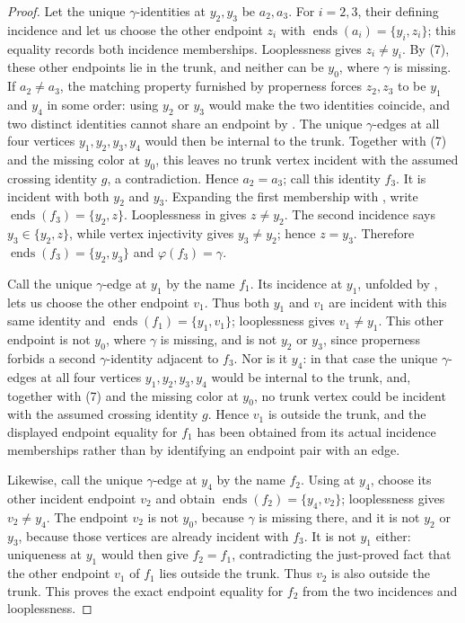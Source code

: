 \begin{proof}
Let the unique $\gamma$-identities at $y_2,y_3$ be $a_2,a_3$.  For
$i=2,3$, their defining incidence and  let us choose
the other endpoint $z_i$ with
$\operatorname{ends}(a_i)=\{y_i,z_i\}$; this equality records both
incidence memberships.  Looplessness gives $z_i\ne y_i$.  By (7), these
other endpoints lie in the trunk, and neither can be $y_0$, where
$\gamma$ is missing.  If $a_2\ne a_3$, the matching property furnished by
properness forces $z_2,z_3$ to be $y_1$ and $y_4$ in
some order: using $y_2$ or $y_3$ would make the two identities coincide,
and two distinct identities cannot share an endpoint by
.  The unique $\gamma$-edges at all four vertices
$y_1,y_2,y_3,y_4$ would then be internal to the trunk.  Together with (7)
and the missing color at $y_0$, this leaves no trunk vertex incident with
the assumed crossing identity $g$, a contradiction.  Hence
$a_2=a_3$; call this identity $f_3$.  It is incident with both $y_2$ and
$y_3$.  Expanding the first membership with , write
$\operatorname{ends}(f_3)=\{y_2,z\}$.  Looplessness in
 gives $z\ne y_2$.  The second incidence says
$y_3\in\{y_2,z\}$, while vertex injectivity gives $y_3\ne y_2$; hence
$z=y_3$.  Therefore
$\operatorname{ends}(f_3)=\{y_2,y_3\}$ and
$\varphi(f_3)=\gamma$.

Call the unique $\gamma$-edge at $y_1$ by the name $f_1$.  Its incidence
at $y_1$, unfolded by , lets us choose the other
endpoint $v_1$.  Thus both $y_1$ and $v_1$ are incident with this same
identity and
$\operatorname{ends}(f_1)=\{y_1,v_1\}$; looplessness gives
$v_1\ne y_1$.  This other endpoint is not $y_0$, where
$\gamma$ is missing, and is not $y_2$ or $y_3$, since properness forbids a
second $\gamma$-identity adjacent to $f_3$.  Nor is it $y_4$: in that case
the unique $\gamma$-edges at all four vertices $y_1,y_2,y_3,y_4$ would be
internal to the trunk, and, together with (7) and the missing color at
$y_0$, no trunk vertex could be incident with the assumed crossing
identity $g$.  Hence $v_1$ is outside the trunk, and the displayed
endpoint equality for $f_1$ has been obtained from its actual incidence
memberships rather than by identifying an endpoint pair with an edge.

Likewise, call the unique $\gamma$-edge at $y_4$ by the name $f_2$.
Using  at $y_4$, choose its other incident endpoint
$v_2$ and obtain
$\operatorname{ends}(f_2)=\{y_4,v_2\}$; looplessness gives
$v_2\ne y_4$.  The endpoint $v_2$ is not $y_0$, because $\gamma$ is
missing there, and it is not $y_2$ or $y_3$, because those vertices are
already incident with $f_3$.  It is not $y_1$ either: uniqueness at
$y_1$ would then give $f_2=f_1$, contradicting the just-proved fact that
the other endpoint $v_1$ of $f_1$ lies outside the trunk.  Thus $v_2$ is
also outside the trunk.  This proves the exact endpoint equality for
$f_2$ from the two incidences and looplessness.


\end{proof}
